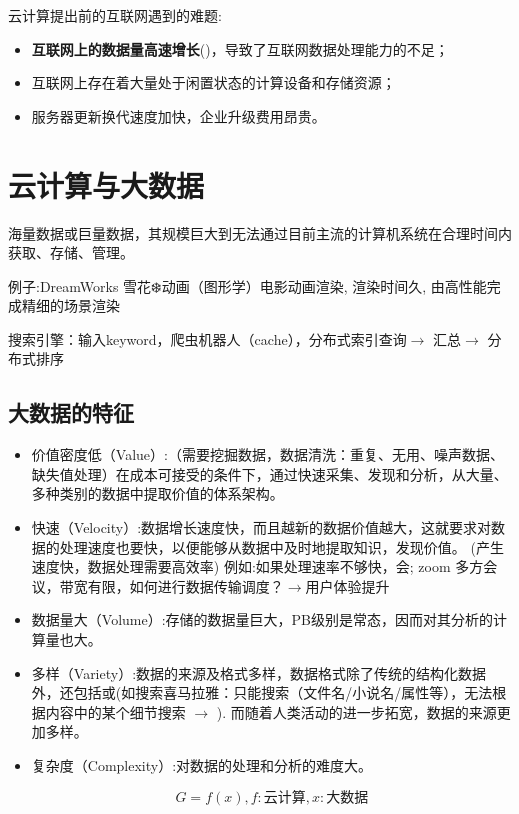 云计算提出前的互联网遇到的难题:
\begin{itemize}
    \item \textbf{互联网上的数据量高速增长}()，导致了互联网数据处理能力的不足；
    \item 互联网上存在着大量处于闲置状态的计算设备和存储资源；
    \item 服务器更新换代速度加快，企业升级费用昂贵。 
\end{itemize}

\section{云计算与大数据}

\begin{definition}
    海量数据或巨量数据，其规模巨大到无法通过目前主流的计算机系统在合理时间内获取、存储、管理。
\end{definition}

例子:DreamWorks 雪花❄️动画（图形学）电影动画渲染, 渲染时间久, 由高性能完成精细的场景渲染

搜索引擎：输入keyword，爬虫机器人（cache），分布式索引查询$\rightarrow$ 汇总$\rightarrow$ 分布式排序

\subsection{大数据的特征}

\begin{itemize}
    \item 价值密度低（Value）:（需要挖掘数据，数据清洗：重复、无用、噪声数据、缺失值处理）在成本可接受的条件下，通过快速采集、发现和分析，从大量、多种类别的数据中提取价值的体系架构。 

    \item 快速（Velocity）:数据增长速度快，而且越新的数据价值越大，这就要求对数据的处理速度也要快，以便能够从数据中及时地提取知识，发现价值。 (产生速度快，数据处理需要高效率) 例如:如果处理速率不够快，会; zoom 多方会议，带宽有限，如何进行数据传输调度？$\rightarrow$用户体验提升

    \item 数据量大（Volume）:存储的数据量巨大，PB级别是常态，因而对其分析的计算量也大。 

    \item  多样（Variety）:数据的来源及格式多样，数据格式除了传统的结构化数据外，还包括或(如搜索喜马拉雅：只能搜索（文件名/小说名/属性等），无法根据内容中的某个细节搜索 $\rightarrow$ ). 而随着人类活动的进一步拓宽，数据的来源更加多样。 

   \item 复杂度（Complexity）:对数据的处理和分析的难度大。 

   $$G=f(x), f:\text{云计算}, x:\text{大数据}$$
\end{itemize}



